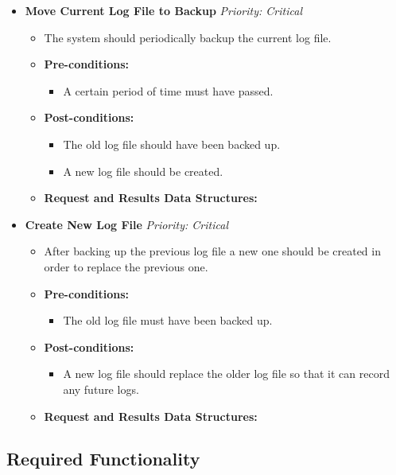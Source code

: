 \documentclass{article}
\begin{document}
				\begin{itemize}
					\item \textbf{Move Current Log File to Backup} \hfill \textit{Priority: Critical}
					\begin{itemize}
						\item The system should periodically backup the current log file.
						\item \textbf{Pre-conditions:}
						\begin{itemize}
							\item A certain period of time must have passed.
						\end{itemize}
						\item \textbf{Post-conditions:}
						\begin{itemize}
							\item The old log file should have been backed up.
							\item A new log file should be created.
						\end{itemize}
						\item \textbf{Request and Results Data Structures:}
					\end{itemize}
					
					\item \textbf{Create New Log File} \hfill \textit{Priority: Critical}
					\begin{itemize}
						\item After backing up the previous log file a new one should be created in order to replace the previous one.
						\item \textbf{Pre-conditions:}
						\begin{itemize}
							\item The old log file must have been backed up.
						\end{itemize}
						\item \textbf{Post-conditions:}
						\begin{itemize}
							\item A new log file should replace the older log file so that it can record any future logs.
						\end{itemize}
						\item \textbf{Request and Results Data Structures:}
					\end{itemize}
				\end{itemize}
			
		\cleardoublepage
		\subsection{Required Functionality}\label{subsec:requiredfunctionionality}
\end{document}
